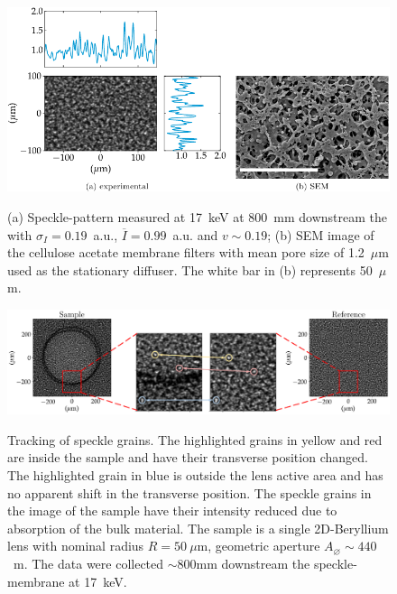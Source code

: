 \begin{refsection}
\begin{figure}[t]
        \centering
        {\includegraphics[width=0.6\linewidth]{figures/ch04/SpecklePattern.pdf}}
        \caption[Speckle-pattern and the stationary diffuser]{(a) Speckle-pattern measured at 17~keV at 800~mm downstream the with $\sigma_I=0.19$~a.u., $\overline{I}=0.99$~a.u. and $v\sim0.19$; (b) SEM image of the cellulose acetate membrane filters with mean pore size of 1.2~$\mu$m used as the stationary diffuser. The white bar in (b) represents 50~$\mu$m.} \label{fig:SpecklePattern}
\end{figure}

\begin{figure}[t]
        \centering
        {\includegraphics[width=1\linewidth]{figures/ch04/speckle_tracking.pdf}}
        \caption[Tracking of speckle grain]{Tracking of speckle grains. The highlighted grains in yellow and red are inside the sample and have their transverse position changed. The highlighted grain in blue is outside the lens active area and has no apparent shift in the transverse position. The speckle grains in the image of the sample have their intensity reduced due to absorption of the bulk material. The sample is a single 2D-Beryllium lens with nominal radius $R=50~\mu\text{m}$, geometric aperture $A_{\diameter}\sim440$~\textmu m. The data were collected $\sim$800mm downstream the speckle-membrane at 17~keV.} \label{fig:speckle_tracking}
\end{figure}


\end{refsection}
